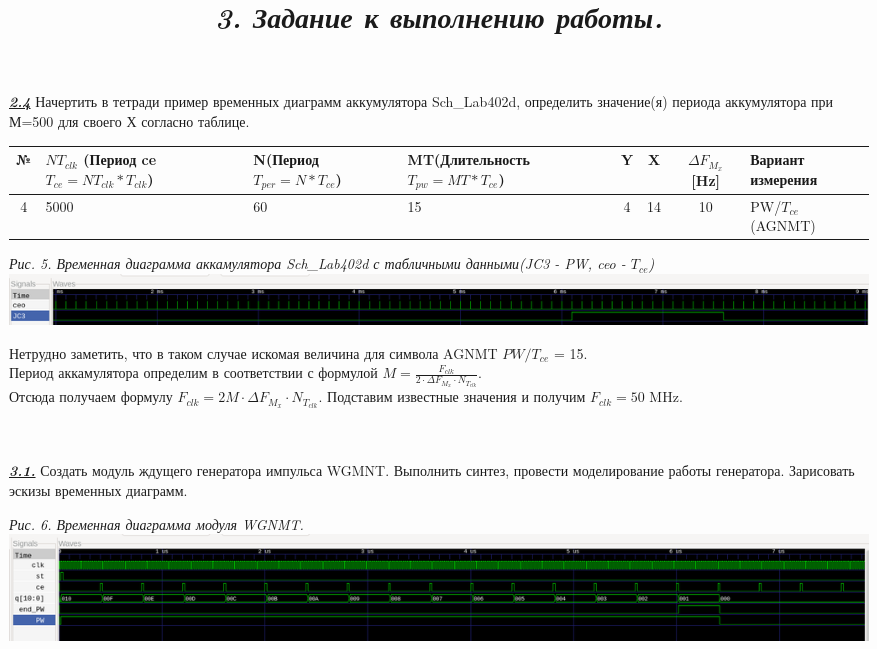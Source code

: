 \documentclass[a4paper]{article}
\begin{document}
\textbf{\textit{\underline{2.4}}} Начертить в тетради пример временных диаграмм аккумулятора Sch\_Lab402d, определить значение(я) периода аккумулятора при М=500 для своего Х согласно таблице.
\begin{center}
	\begin{tabular}{|c|p{2.5cm}|p{2cm}|p{2.5cm}|c|c|c|p{4cm}|}
		\hline
		№	& $NT_{clk}$ \scriptsize{(Период ce $T_{ce}=NT_{clk}*T_{clk}$)} & N\scriptsize{(Период $T_{per}=N*T_{ce}$)} & MT\scriptsize{(Длительность $T_{pw}=MT*T_{ce}$)}   & Y & X & {$\Delta F_{M_{x}}	$} [Hz] & Вариант измерения \\
		\hline
		4 & 5000 & 60 & 15 & 4 & 14 & 10 & PW/$T_{ce}$ (AGNMT) \\
		\hline
	\end{tabular}
\end{center}

\begin{center}
	\textit{Рис. 5. Временная диаграмма аккамулятора Sch\_Lab402d с табличными данными(JC3 - PW, ceo - $T_{ce}$)}
	\includegraphics[scale=0.3]{../images/Sch_Lab402d.png}
\end{center}

Нетрудно заметить, что в таком случае искомая величина для символа AGNMT $PW/T_{ce}$ = 15. \\
Период аккамулятора определим в соответствии с формулой $M=\frac{F_{clk}}{2 \cdot \Delta F_{M_{x}} \cdot N_{T_{clk}}}$.\\
Отсюда получаем формулу $F_{clk}=2M\cdot\Delta F_{M_{x}} \cdot N_{T_{clk}}$. Подставим известные значения и получим $F_{clk} = 50$ MHz.\\

\title{\large{\textit{3. Задание к выполнению работы.}}}\\\\

\textbf{\textit{\underline{3.1.}}} Создать модуль ждущего генератора импульса WGMNT. Выполнить синтез, провести моделирование работы генератора. Зарисовать эскизы временных диаграмм.
\begin{center}
	\textit{Рис. 6. Временная диаграмма модуля WGNMT.}
	\includegraphics[scale=0.3]{../images/WGMT.png}
\end{center}
\end{document}
